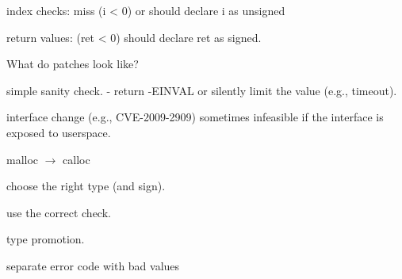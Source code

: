 index checks:
miss (i < 0) or should declare i as unsigned

return values: (ret < 0)
should declare ret as signed.

What do patches look like?

simple sanity check.
- return -EINVAL or silently limit the value (e.g., timeout).

interface change (e.g., CVE-2009-2909)
sometimes infeasible if the interface is exposed to userspace.


malloc $\to$ calloc

choose the right type (and sign).

use the correct check.

type promotion.

separate error code with bad values
